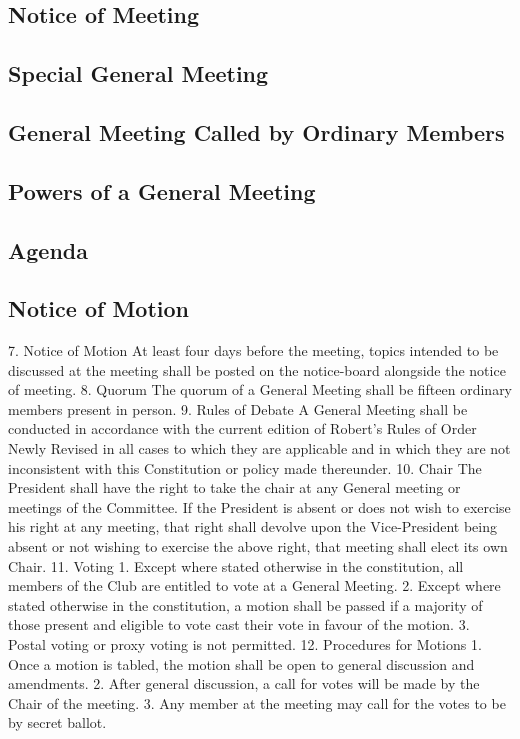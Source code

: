 \documentclass[12pt]{article} %
\begin{document}
\subsection{Notice of Meeting}
\subsection{Special General Meeting}
\subsection{General Meeting Called by Ordinary Members}
\subsection{Powers of a General Meeting}
\subsection{Agenda}
\subsection{Notice of Motion}
7. Notice of Motion
At least four days before the meeting, topics intended to be discussed at the meeting
shall be posted on the notice-board alongside the notice of meeting.
8. Quorum
The quorum of a General Meeting shall be fifteen ordinary members present in
person.
9. Rules of Debate
A General Meeting shall be conducted in accordance with the current edition of
Robert’s Rules of Order Newly Revised in all cases to which they are applicable and
in which they are not inconsistent with this Constitution or policy made thereunder.
10. Chair
The President shall have the right to take the chair at any General meeting or
meetings of the Committee. If the President is absent or does not wish to exercise his
right at any meeting, that right shall devolve upon the Vice-President being absent or
not wishing to exercise the above right, that meeting shall elect its own Chair.
11. Voting
1. Except where stated otherwise in the constitution, all members of the Club
are entitled to vote at a General Meeting.
2. Except where stated otherwise in the constitution, a motion shall be passed if
a majority of those present and eligible to vote cast their vote in favour of the
motion.
3. Postal voting or proxy voting is not permitted.
12. Procedures for Motions
1. Once a motion is tabled, the motion shall be open to general discussion and
amendments.
2. After general discussion, a call for votes will be made by the Chair of the
meeting.
3. Any member at the meeting may call for the votes to be by secret ballot.
\end{document}
